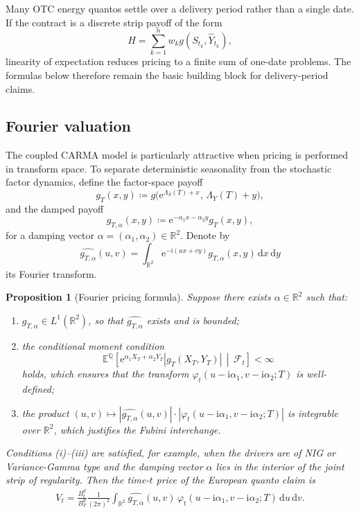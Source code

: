 \documentclass[10pt,a4paper,reqno]{amsart}
\newtheorem{proposition}[theorem]{Proposition}
\newcommand{\R}{\mathbb{R}}
\newcommand{\E}{\mathbb{E}}
\newcommand{\Q}{\mathbb{Q}}
\newcommand{\F}{\mathcal{F}}
\newcommand{\1}{\mathbbm{1}}
\newcommand{\dd}{\mathrm{d}}
\newcommand{\ii}{\mathrm{i}}
\newcommand{\ee}{\mathrm{e}}
\begin{document}
Many OTC energy quantos settle over a delivery period rather than a single date.
If the contract is a discrete strip payoff of the form
$$
H = \sum_{k=1}^n w_k g(S_{t_k},\widehat{Y}_{t_k}),
$$
linearity of expectation reduces pricing to a finite sum of one-date problems.
The formulas below therefore remain the basic building block for
delivery-period claims.

\subsection{Fourier valuation}

The coupled CARMA model is particularly attractive when pricing is performed in
transform space. To separate deterministic seasonality from the stochastic
factor dynamics, define the factor-space payoff
$$
g_T(x,y) \coloneqq g\!\bigl(\ee^{\Lambda_S(T)+x},\, \Lambda_Y(T)+y\bigr),
$$
and the damped payoff
$$
g_{T,\alpha}(x,y) \coloneqq \ee^{-\alpha_1 x-\alpha_2 y} g_T(x,y),
$$
for a damping vector $\alpha=(\alpha_1,\alpha_2)\in\R^2$. Denote by
$$
\widehat{g_{T,\alpha}}(u,v)
= \int_{\R^2} \ee^{-\ii(ux+vy)} g_{T,\alpha}(x,y)\,\dd x\,\dd y
$$
its Fourier transform.

\begin{proposition}[Fourier pricing formula]
\label{prop:fourier_pricing}
Suppose there exists $\alpha\in\R^2$ such that:
\begin{enumerate}[label=(\roman*)]
  \item $g_{T,\alpha} \in L^1(\R^2)$, so that $\widehat{g_{T,\alpha}}$
    exists and is bounded;
  \item the conditional moment condition
    $$
    \E^\Q\!\left[
      \ee^{\alpha_1 X_T + \alpha_2 Y_T}
      \left|g_T(X_T,Y_T)\right|
      \,\middle|\, \F_t
    \right] < \infty
    $$
    holds, which ensures that the transform $\varphi_t(u-\ii\alpha_1,
    v-\ii\alpha_2;T)$ is well-defined;
  \item the product $(u,v) \mapsto
    |\widehat{g_{T,\alpha}}(u,v)|\cdot|\varphi_t(u-\ii\alpha_1,v-\ii\alpha_2;T)|$
    is integrable over $\R^2$, which justifies the Fubini interchange.
\end{enumerate}
Conditions (i)--(iii) are satisfied, for example, when the drivers are of
NIG or Variance-Gamma type and the damping vector $\alpha$ lies in
the interior of the joint strip of regularity.
Then the time-$t$ price of the European quanto claim is
\begin{align}\label{eq:fourier_pricing}
  V_t
  = \frac{B_t^d}{B_T^d} \frac{1}{(2\pi)^2}
    \int_{\R^2}
      \widehat{g_{T,\alpha}}(u,v)\,
      \varphi_t(u-\ii\alpha_1,v-\ii\alpha_2;T)
      \,\dd u\,\dd v.
\end{align}
\end{proposition}
\end{document}
